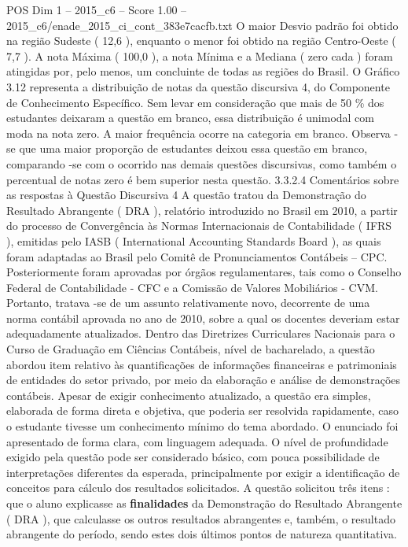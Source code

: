 \begin{textsample}{POS Dim 1 – 2015\_c6 – Score 1.00 – 2015\_c6/enade\_2015\_ci\_cont\_383e7cacfb.txt}
O maior Desvio padrão foi obtido na região Sudeste ( 12,6 ), enquanto o menor foi obtido na região Centro-Oeste ( 7,7 ).
A nota Máxima ( 100,0 ), a nota Mínima e a Mediana ( zero cada ) foram atingidas por, pelo menos, um concluinte de todas as regiões do Brasil.
O Gráfico 3.12 representa a distribuição de notas da questão discursiva 4, do Componente de Conhecimento Específico.
Sem levar em consideração que mais de 50 \% dos estudantes deixaram a questão em branco, essa distribuição é unimodal com moda na nota zero.
A maior frequência ocorre na categoria em branco.
Observa -se que uma maior proporção de estudantes deixou essa questão em branco, comparando -se com o ocorrido nas demais questões discursivas, como também o percentual de notas zero é bem superior nesta questão. 3.3.2.4 Comentários sobre as respostas à Questão Discursiva 4 A questão tratou da Demonstração do Resultado Abrangente ( DRA ), relatório introduzido no Brasil em 2010, a partir do processo de Convergência às Normas Internacionais de Contabilidade ( IFRS ), emitidas pelo IASB ( International Accounting Standards Board ), as quais foram adaptadas ao Brasil pelo Comitê de Pronunciamentos Contábeis – CPC.
Posteriormente foram aprovadas por órgãos regulamentares, tais como o Conselho Federal de Contabilidade - CFC e a Comissão de Valores Mobiliários - CVM.
Portanto, tratava -se de um assunto relativamente novo, decorrente de uma norma contábil aprovada no ano de 2010, sobre a qual os docentes deveriam estar adequadamente atualizados.
Dentro das Diretrizes Curriculares Nacionais para o Curso de Graduação em Ciências Contábeis, nível de bacharelado, a questão abordou item relativo às quantificações de informações financeiras e patrimoniais de entidades do setor privado, por meio da elaboração e análise de demonstrações contábeis.
Apesar de exigir conhecimento atualizado, a questão era simples, elaborada de forma direta e objetiva, que poderia ser resolvida rapidamente, caso o estudante tivesse um conhecimento mínimo do tema abordado.
O enunciado foi apresentado de forma clara, com linguagem adequada.
O nível de profundidade exigido pela questão pode ser considerado básico, com pouca possibilidade de interpretações diferentes da esperada, principalmente por exigir a identificação de conceitos para cálculo dos resultados solicitados.
A questão solicitou três itens : que o aluno explicasse as \textbf{finalidades} da Demonstração do Resultado Abrangente ( DRA ), que calculasse os outros resultados abrangentes e, também, o resultado abrangente do período, sendo estes dois últimos pontos de natureza quantitativa.

\end{textsample}
